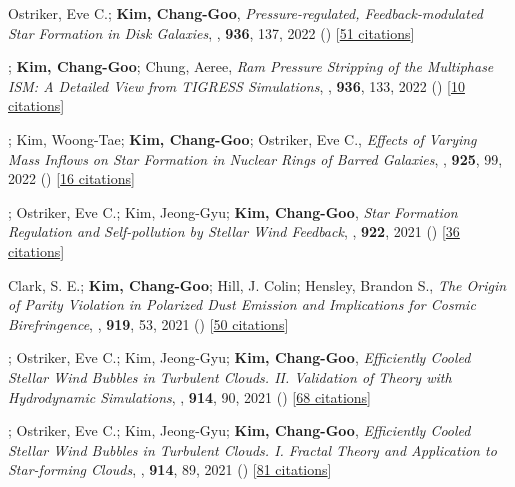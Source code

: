 \item[{29.}]Ostriker, Eve C.; \textbf{Kim, Chang-Goo}, \textit{Pressure-regulated, Feedback-modulated Star Formation in Disk Galaxies}, , \textbf{936}, 137, 2022 () [\href{http://adsabs.harvard.edu/abs/2022ApJ...936..137O}{51 citations}]

\item[{28.}]; \textbf{Kim, Chang-Goo}; Chung, Aeree, \textit{Ram Pressure Stripping of the Multiphase ISM: A Detailed View from TIGRESS Simulations}, , \textbf{936}, 133, 2022 () [\href{http://adsabs.harvard.edu/abs/2022ApJ...936..133C}{10 citations}]

\item[{27.}]; Kim, Woong-Tae; \textbf{Kim, Chang-Goo}; Ostriker, Eve C., \textit{Effects of Varying Mass Inflows on Star Formation in Nuclear Rings of Barred Galaxies}, , \textbf{925}, 99, 2022 () [\href{http://adsabs.harvard.edu/abs/2022ApJ...925...99M}{16 citations}]

\item[{26.}]; Ostriker, Eve C.; Kim, Jeong-Gyu; \textbf{Kim, Chang-Goo}, \textit{Star Formation Regulation and Self-pollution by Stellar Wind Feedback}, , \textbf{922}, 2021 () [\href{http://adsabs.harvard.edu/abs/2021ApJ...922L...3L}{36 citations}]

\item[{25.}]Clark, S. E.; \textbf{Kim, Chang-Goo}; Hill, J. Colin; Hensley, Brandon S., \textit{The Origin of Parity Violation in Polarized Dust Emission and Implications for Cosmic Birefringence}, , \textbf{919}, 53, 2021 () [\href{http://adsabs.harvard.edu/abs/2021ApJ...919...53C}{50 citations}]

\item[{24.}]; Ostriker, Eve C.; Kim, Jeong-Gyu; \textbf{Kim, Chang-Goo}, \textit{Efficiently Cooled Stellar Wind Bubbles in Turbulent Clouds. II. Validation of Theory with Hydrodynamic Simulations}, , \textbf{914}, 90, 2021 () [\href{http://adsabs.harvard.edu/abs/2021ApJ...914...90L}{68 citations}]

\item[{23.}]; Ostriker, Eve C.; Kim, Jeong-Gyu; \textbf{Kim, Chang-Goo}, \textit{Efficiently Cooled Stellar Wind Bubbles in Turbulent Clouds. I. Fractal Theory and Application to Star-forming Clouds}, , \textbf{914}, 89, 2021 () [\href{http://adsabs.harvard.edu/abs/2021ApJ...914...89L}{81 citations}]

